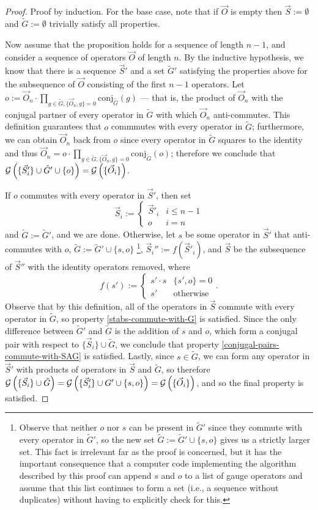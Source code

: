 \documentclass[twocolumn,showpacs,preprintnumbers,amsmath,amssymb,nofootinbib,pra,floatfix]{revtex4-1}
\newcommand{\lst}{\vec}
\newcommand{\set}{\tilde}
\newcommand{\genfun}{\mathcal{G}}
\begin{document}
\begin{proof}
Proof by induction.  For the base case, note that if $\lst O$ is empty then $\lst S:=\emptyset$ and $\set G:=\emptyset$ trivially satisfy all properties.

Now assume that the proposition holds for a sequence of length $n-1$, and consider a sequence of operators $\lst O$ of length $n$.  By the inductive hypothesis, we know that there is a sequence $\lst S'$ and a set $\set G'$ satisfying the properties above for the subsequence of $\lst O$ consisting of the first $n-1$ operators.  Let $o:=\lst O_n\cdot \prod_{g\in \set G, \{\lst O_n,g\}=0} \text{conj}_{\set G}(g)$ --- that is, the product of $\lst O_n$ with the conjugal partner of every operator in $\set G$ with which $\lst O_n$ anti-commutes.  This definition guarantees that $o$ commmutes with every operator in $\set G$;  furthermore, we can obtain $\lst O_n$ back from $o$ since every operator in $\set G$ squares to the identity and thus $\lst O_n=o\cdot \prod_{g\in \set G, \{\lst O_n,g\}=0} \text{conj}_{\set G}(o)$; therefore we conclude that $\genfun\paren{\{\lst S'_i\} \cup \set G' \cup \{o\}}=\genfun\paren{\{\lst O_i\}}$.

If $o$ commutes with every operator in $\lst S'$, then set
$$\lst S_i :=
\begin{cases}
\lst S'_i & i \le n-1 \\
o & i = n
\end{cases}
$$
and $\set G := \set G'$, and we are done.  Otherwise, let $s$ be some operator in $\lst S'$ that anti-commutes with $o$, $\set G:=\set G'\cup \{s,o\}$
\footnote{Observe that neither $o$ nor $s$ can be present in $\set G'$ since they commute with every operator in $\set G'$, so the new set $\set G:=\set G'\cup \{s,o\}$ gives us a strictly larger set.  This fact is irrelevant far as the proof is concerned, but it has the important consequence that a computer code implementing the algorithm described by this proof can append $s$ and $o$ to a list of gauge operators and assume that this list continues to form a set (i.e., a sequence without duplicates) without having to explicitly check for this.}, $\lst S_i'' := f(\lst S'_i)$, and $\lst S$ be the subsequence of $\lst S''$ with the identity operators removed, where
$$
f(s') :=
\begin{cases}
s'\cdot s & \{s',o\}=0\\
s' & \text{otherwise}
\end{cases}.
$$
Observe that by this definition, all of the operators in $\lst S$ commute with every operator in $\set G$, so property \ref{stabs-commute-with-G} is satisfied.  Since the only difference between $\set G'$ and $\set G$ is the addition of $s$ and $o$, which form a conjugal pair with respect to $\{\lst S_i\} \cup \set G$, we conclude that property \ref{conjugal-pairs-commute-with-SAG} is satisfied.
Lastly, since $s\in \set G$, we can form any operator in $\lst S'$ with products of operators in $\lst S$ and $\set G$, so therefore $\genfun\paren{\{\lst S_i\} \cup \set G}=\genfun\paren{\{\lst S'_i\} \cup G' \cup \{s,o\}}=\genfun\paren{\{\lst O_i\}}$, and so the final property is satisfied.


\end{proof}
\end{document}
